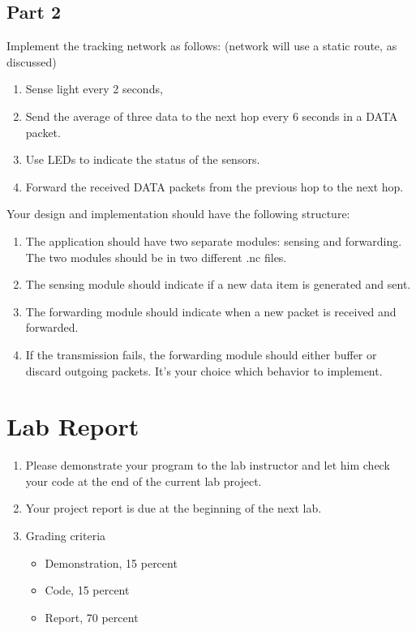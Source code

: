 \documentclass[letterpaper,12pt]{article}
\begin{document}
\subsection*{Part 2}
Implement the tracking network as follows: (network will use a static route, as discussed)
\begin{enumerate}
    \item Sense light every 2 seconds,
    \item Send the average of three data to the next hop every 6 seconds in a DATA packet.
    \item Use LEDs to indicate the status of the sensors.
    \item Forward the received DATA packets from the previous hop to the next hop.
\end{enumerate}

Your design and implementation should have the following structure:
\begin{enumerate}
    \item The application should have two separate modules: sensing and forwarding.
       The two modules should be in two different .nc files.
    \item The sensing module should indicate if a new data item is generated and sent.
    \item The forwarding module should indicate when a new packet is received and forwarded.
    \item If the transmission fails, the forwarding module should either buffer or discard
       outgoing packets. It's your choice which behavior to implement.
\end{enumerate}


\section*{Lab Report}
\begin{enumerate}
   \item Please demonstrate your program to the lab instructor and let him check your code at the end of the current lab project.
   \item Your project report is due at the beginning of the next lab.
   \item Grading criteria
      \begin{itemize}
         \item Demonstration, 15 percent
         \item Code, 15 percent
         \item Report, 70 percent
      \end{itemize}
\end{enumerate}
\end{document}
